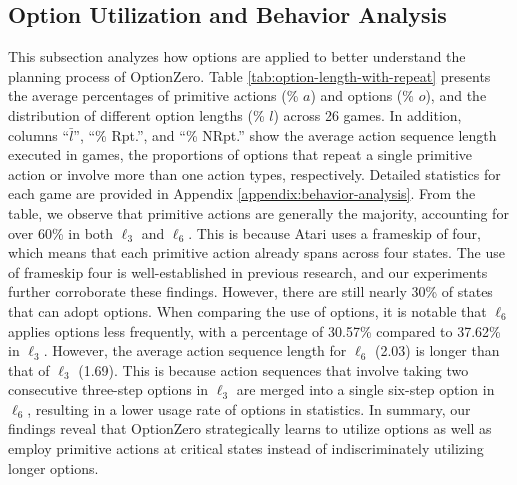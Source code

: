 



\subsection{Option Utilization and Behavior Analysis}
\label{sec:behavior-analysis}
This subsection analyzes how options are applied to better understand the planning process of OptionZero.
Table \ref{tab:option-length-with-repeat} presents the average percentages of primitive actions (\% $a$) and options (\% $o$), and the distribution of different option lengths (\% $l$) across 26 games.
In addition, columns ``$\bar{l}$'', ``\% Rpt.'', and ``\% NRpt.'' show the average action sequence length executed in games, the proportions of options that repeat a single primitive action or involve more than one action types, respectively.
Detailed statistics for each game are provided in Appendix \ref{appendix:behavior-analysis}.
From the table, we observe that primitive actions are generally the majority, accounting for over 60\% in both $\ell_3$ and $\ell_6$.
This is because Atari uses a frameskip of four, which means that each primitive action already spans across four states.
The use of frameskip four is well-established in previous research, and our experiments further corroborate these findings.
However, there are still nearly 30\% of states that can adopt options.
When comparing the use of options, it is notable that $\ell_6$ applies options less frequently, with a percentage of 30.57\% compared to 37.62\% in $\ell_3$.
However, the average action sequence length for $\ell_6$ (2.03) is longer than that of $\ell_3$ (1.69).
This is because action sequences that involve taking two consecutive three-step options in $\ell_3$ are merged into a single six-step option in $\ell_6$, resulting in a lower usage rate of options in statistics.
In summary, our findings reveal that OptionZero strategically learns to utilize options as well as employ primitive actions at critical states instead of indiscriminately utilizing longer options.

